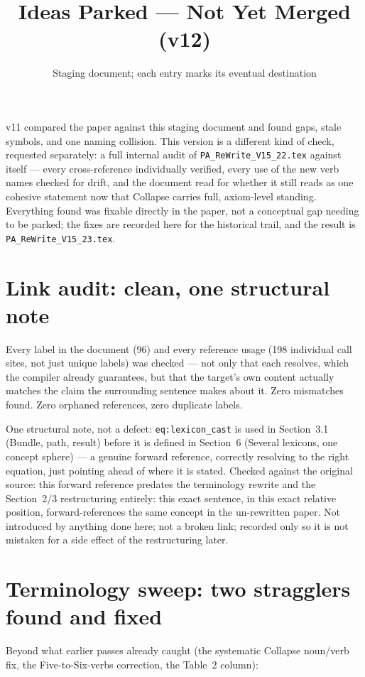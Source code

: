 \documentclass[11pt]{article}
\title{Ideas Parked --- Not Yet Merged (v12)}
\author{Staging document; each entry marks its eventual destination}
\date{}
\begin{document}
\maketitle

\noindent v11 compared the paper against this staging document and
found gaps, stale symbols, and one naming collision. This version is
a different kind of check, requested separately: a full internal
audit of \texttt{PA\_ReWrite\_V15\_22.tex} against itself --- every
cross-reference individually verified, every use of the new verb
names checked for drift, and the document read for whether it still
reads as one cohesive statement now that Collapse carries full,
axiom-level standing. Everything found was fixable directly in the
paper, not a conceptual gap needing to be parked; the fixes are
recorded here for the historical trail, and the result is
\texttt{PA\_ReWrite\_V15\_23.tex}.

\section{Link audit: clean, one structural note}

Every label in the document (96) and every reference usage (198
individual call sites, not just unique labels) was checked --- not
only that each resolves, which the compiler already guarantees, but
that the target's own content actually matches the claim the
surrounding sentence makes about it. Zero mismatches found. Zero
orphaned references, zero duplicate labels.

One structural note, not a defect: \texttt{eq:lexicon\_cast} is used
in Section~3.1 (Bundle, path, result) before it is defined in
Section~6 (Several lexicons, one concept sphere) --- a genuine
forward reference, correctly resolving to the right equation, just
pointing ahead of where it is stated. Checked against the original
source: this forward reference predates the terminology rewrite and
the Section~2/3 restructuring entirely: this exact sentence, in this
exact relative position, forward-references the same concept in the
un-rewritten paper. Not introduced by anything done here; not a
broken link; recorded only so it is not mistaken for a side effect
of the restructuring later.

\section{Terminology sweep: two stragglers found and fixed}

Beyond what earlier passes already caught (the systematic Collapse
noun/verb fix, the Five-to-Six-verbs correction, the Table~2 column):
\end{document}
